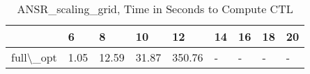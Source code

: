 \begin{table}
\centering
\caption{ANSR\_scaling\_grid, Time in Seconds to Compute CTL}
\label{ANSR_scaling_grid_CTL_time}
\begin{tabular}{lllllllll}
\toprule
{} &     6 &      8 &     10 &      12 & 14 & 16 & 18 & 20 \\
\midrule
full\textbackslash \_opt &  1.05 &  12.59 &  31.87 &  350.76 &  - &  - &  - &  - \\
\bottomrule
\end{tabular}
\end{table}

